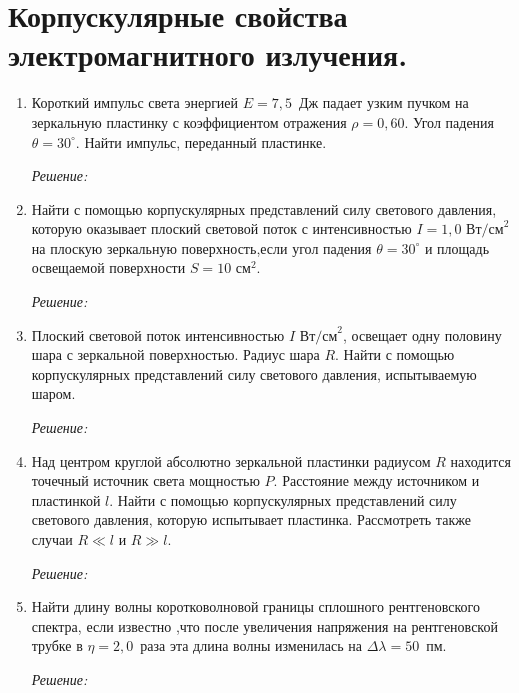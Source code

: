 \section{Корпускулярные свойства электромагнитного излучения.}
\begin{enumerate}

\item Короткий импульс света энергией \( E = 7,\!5 \)~Дж падает узким пучком на
зеркальную пластинку с коэффициентом отражения \( \rho = 0,\!60 \). Угол падения
\( \theta = 30^\circ \). Найти импульс, переданный пластинке.

\emph{Решение:}

\newpage

\item Найти с помощью корпускулярных представлений силу светового давления,
которую оказывает плоский световой поток с интенсивностью
\( I = 1,\!0\text{~Вт/см}^2 \) на плоскую зеркальную поверхность,если угол
падения \( \theta = 30^\circ \) и площадь освещаемой поверхности
\( S = 10\text{~см}^2 \).

\emph{Решение:}

\newpage

\item Плоский световой поток интенсивностью \( I \text{~Вт/см}^2 \), освещает
одну половину шара с зеркальной поверхностью. Радиус шара \( R \). Найти с
помощью корпускулярных представлений силу светового давления, испытываемую
шаром.

\emph{Решение:}

\newpage

\item Над центром круглой абсолютно зеркальной пластинки радиусом \( R \)
находится точечный источник света мощностью \( P \). Расстояние между источником
и пластинкой \( l \). Найти с помощью корпускулярных представлений силу
светового давления, которую испытывает пластинка. Рассмотреть также случаи
\( R \ll l \) и \( R \gg l \).

\emph{Решение:}

\newpage

\item Найти длину волны коротковолновой границы сплошного рентгеновского
спектра, если известно ,что после увеличения напряжения на рентгеновской трубке
в \( \eta = 2,\!0 \)~раза эта длина волны изменилась на
\( \Delta\lambda = 50 \)~пм.

\emph{Решение:}


\end{enumerate}
